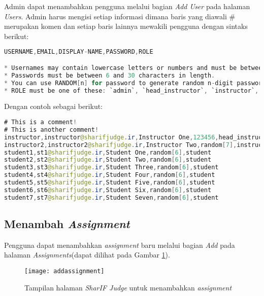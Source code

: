 Admin dapat menambahkan pengguna melalui bagian \textit{Add User} pada halaman \textit{Users}. Admin harus mengisi setiap informasi dimana baris yang diawali \# merupakan komen dan setiap baris lainnya mewakili pengguna dengan sintaks berikut:
\begin{lstlisting}[language=Java, caption=Contoh sintaks untuk menambahkan pengguna, label=kode:addUser]
USERNAME,EMAIL,DISPLAY-NAME,PASSWORD,ROLE

* Usernames may contain lowercase letters or numbers and must be between 3 and 20 characters in length.
* Passwords must be between 6 and 30 characters in length.
* You can use RANDOM[n] for password to generate random n-digit password.
* ROLE must be one of these: `admin`, `head_instructor`, `instructor`, `student`
\end{lstlisting}

Dengan contoh sebagai berikut:
\begin{lstlisting}[language=Java, caption=Contoh kode untuk menambahkan pengguna, label=kode:addUserExample]
# This is a comment!
# This is another comment!
instructor,instructor@sharifjudge.ir,Instructor One,123456,head_instructor
instructor2,instructor2@sharifjudge.ir,Instructor Two,random[7],instructor
student1,st1@sharifjudge.ir,Student One,random[6],student
student2,st2@sharifjudge.ir,Student Two,random[6],student
student3,st3@sharifjudge.ir,Student Three,random[6],student
student4,st4@sharifjudge.ir,Student Four,random[6],student
student5,st5@sharifjudge.ir,Student Five,random[6],student
student6,st6@sharifjudge.ir,Student Six,random[6],student
student7,st7@sharifjudge.ir,Student Seven,random[6],student
\end{lstlisting}

\subsection{Menambah \textit{Assignment}}
\label{sec:addAssignment}
Pengguna dapat menambahkan \textit{assignment} baru melalui bagian \textit{Add} pada halaman \textit{Assignments}(dapat dilihat pada Gambar \ref{fig:addassignment}).
\begin{figure}[H]
	\centering  
	\texttt{[image: addassignment]}  
	\caption[Tampilan halaman \textit{SharIF Judge} untuk menambahkan \textit{assignment}]{Tampilan halaman \textit{SharIF Judge} untuk menambahkan \textit{assignment}} 
	\label{fig:addassignment} 
\end{figure} 

